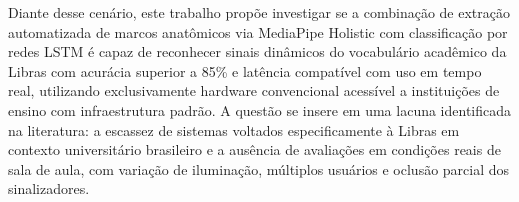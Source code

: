 Diante desse cenário, este trabalho propõe investigar se a combinação de extração automatizada de marcos anatômicos via MediaPipe Holistic com classificação por redes LSTM é capaz de reconhecer sinais dinâmicos do vocabulário acadêmico da Libras com acurácia superior a 85\% e latência compatível com uso em tempo real, utilizando exclusivamente hardware convencional acessível a instituições de ensino com infraestrutura padrão. A questão se insere em uma lacuna identificada na literatura: a escassez de sistemas voltados especificamente à Libras em contexto universitário brasileiro e a ausência de avaliações em condições reais de sala de aula, com variação de iluminação, múltiplos usuários e oclusão parcial dos sinalizadores.
